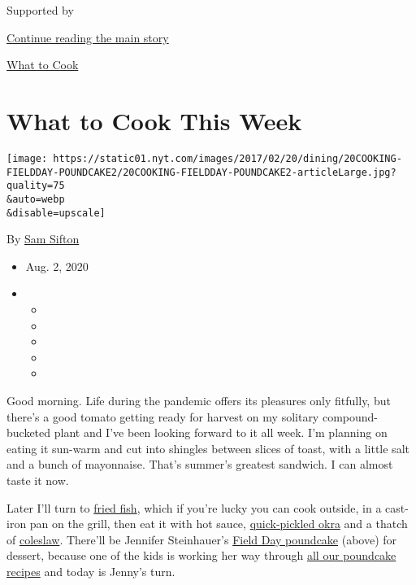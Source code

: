 Supported by

\protect\hyperlink{after-sponsor}{Continue reading the main story}

\href{/column/what-to-cook}{What to Cook}

\hypertarget{what-to-cook-this-week}{%
\section{What to Cook This Week}\label{what-to-cook-this-week}}

\texttt{[image: https://static01.nyt.com/images/2017/02/20/dining/20COOKING-FIELDDAY-POUNDCAKE2/20COOKING-FIELDDAY-POUNDCAKE2-articleLarge.jpg?quality=75\\\&auto=webp\\\&disable=upscale]}

By \href{https://www.nytimes.com/by/sam-sifton}{Sam Sifton}

\begin{itemize}
\item
  Aug. 2, 2020
\item
  \begin{itemize}
  \item
  \item
  \item
  \item
  \item
  \end{itemize}
\end{itemize}

Good morning. Life during the pandemic offers its pleasures only
fitfully, but there's a good tomato getting ready for harvest on my
solitary compound-bucketed plant and I've been looking forward to it all
week. I'm planning on eating it sun-warm and cut into shingles between
slices of toast, with a little salt and a bunch of mayonnaise. That's
summer's greatest sandwich. I can almost taste it now.

Later I'll turn to
\href{https://cooking.nytimes.com/recipes/1014786-outdoor-fish-fry}{fried
fish}, which if you're lucky you can cook outside, in a cast-iron pan on
the grill, then eat it with hot sauce,
\href{https://cooking.nytimes.com/recipes/1021260-quick-pickled-okra}{quick-pickled
okra} and a thatch of
\href{https://cooking.nytimes.com/recipes/1014788-simple-slaw}{coleslaw}.
There'll be Jennifer Steinhauer's
\href{https://cooking.nytimes.com/recipes/12194-field-day-poundcake}{Field
Day poundcake} (above) for dessert, because one of the kids is working
her way through
\href{https://cooking.nytimes.com/search?q=poundcake}{all our poundcake
recipes} and today is Jenny's turn.

